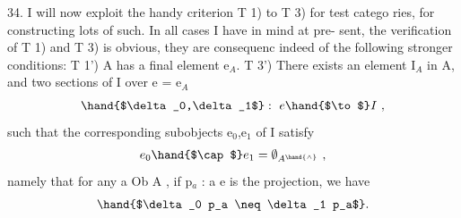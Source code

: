 34.    I will now exploit the handy criterion  T 1) to T 3) for test catego%
ries, for constructing lots of such.  In all cases I have in mind at pre-%
sent,  the verification of  T 1) and T 3) is obvious,  they are consequenc
indeed of the following stronger conditions:
T 1')  A has a final element e$_{A}$.
T 3')  There exists an element I$_{A}$ in A, and two sections  of I over
e = e$_{A}$
\[ \hand{$\delta_0,\delta_1$} :\ e \hand{$\to$} I \ , \]
such that the corresponding subobjects e$_0$,e$_1$ of I satisfy 
\[ e_0\hand{$\cap$}e_1 = \emptyset_{A^{\hand{\wedge}}} \ , \]
namely that for any a \hand{$\in$}Ob A , if p$_{a}$ : a \hand{$\to$}e is the projection, we
have
\[ \hand{$\delta_0 p_a \neq \delta_1 p_a$} . \]

